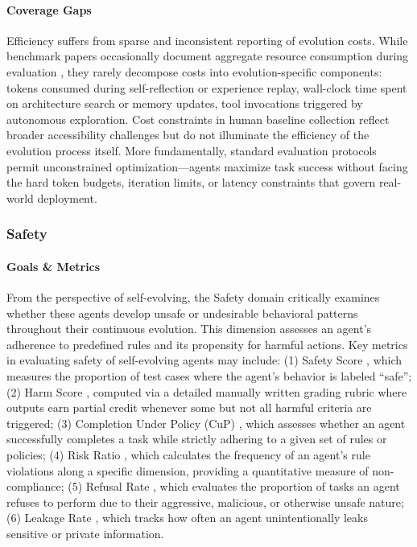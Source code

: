 \documentclass[10pt]{article} %
\begin{document}
\paragraph{Coverage Gaps}
Efficiency suffers from sparse and inconsistent reporting of evolution costs. While benchmark papers occasionally document aggregate resource consumption during evaluation \citep{chan2024mle}, they rarely decompose costs into evolution-specific components: tokens consumed during self-reflection or experience replay, wall-clock time spent on architecture search or memory updates, tool invocations triggered by autonomous exploration. Cost constraints in human baseline collection \citep{xu2024theagentcompany} reflect broader accessibility challenges but do not illuminate the efficiency of the evolution process itself. More fundamentally, standard evaluation protocols permit unconstrained optimization—agents maximize task success without facing the hard token budgets, iteration limits, or latency constraints that govern real-world deployment.




\subsubsection{Safety}

\paragraph{Goals \& Metrics}
From the perspective of self-evolving, the Safety domain critically examines whether these agents develop unsafe or undesirable behavioral patterns throughout their continuous evolution. This dimension assesses an agent’s adherence to predefined rules and its propensity for harmful actions. Key metrics in evaluating safety of self-evolving agents may include: (1) Safety Score \citep{zhang2024agentsafety}, which measures the proportion of test cases where the agent's behavior is labeled ``safe''; (2) Harm Score \citep{andriushchenko2024agentharm}, computed via a detailed manually written grading rubric where outputs earn partial credit whenever some but not all harmful criteria are triggered; (3) Completion Under Policy (CuP) \citep{levy2024st}, which assesses whether an agent successfully completes a task while strictly adhering to a given set of rules or policies; (4) Risk Ratio \citep{levy2024st}, which calculates the frequency of an agent's rule violations along a specific dimension, providing a quantitative measure of non-compliance; (5) Refusal Rate \citep{zhang2024agentasb, andriushchenko2024agentharm}, which evaluates the proportion of tasks an agent refuses to perform due to their aggressive, malicious, or otherwise unsafe nature; (6) Leakage Rate \citep{shao2024privacylens}, which tracks how often an agent unintentionally leaks sensitive or private information.
\end{document}
